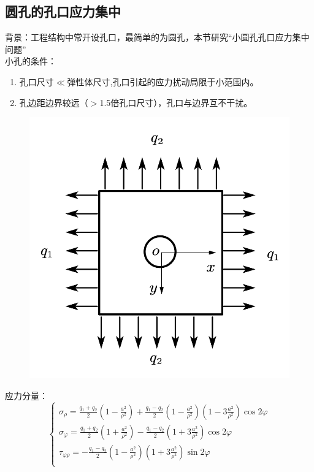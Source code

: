 \subsection{圆孔的孔口应力集中}
背景：工程结构中常开设孔口，最简单的为圆孔，本节研究“小圆孔孔口应力集中问题”\\
小孔的条件：
\begin{enumerate}
\item 孔口尺寸$\ll $弹性体尺寸,孔口引起的应力扰动局限于小范围内。
\item 孔边距边界较远（$>$1.5倍孔口尺寸），孔口与边界互不干扰。
\end{enumerate}
\begin{figure}[H]
	\centering
	\includegraphics[scale=0.6]{figure/4-17.png}
\end{figure}
应力分量：\[\begin{cases}
\sigma _{\rho}=\frac{q_1+q_2}{2}\left( 1-\frac{a^2}{\rho ^2} \right) +\frac{q_1-q_2}{2}\left( 1-\frac{a^2}{\rho ^2} \right) \left( 1-3\frac{a^2}{\rho ^2} \right) \cos 2\varphi\\
\sigma _{\varphi}=\frac{q_1+q_2}{2}\left( 1+\frac{a^2}{\rho ^2} \right) -\frac{q_1-q_2}{2}\left( 1+3\frac{a^2}{\rho ^2} \right) \cos 2\varphi\\
\tau _{\varphi \rho}=-\frac{q_1-q_2}{2}\left( 1-\frac{a^2}{\rho ^2} \right) \left( 1+3\frac{a^2}{\rho ^2} \right) \sin 2\varphi\\
\end{cases}\]
